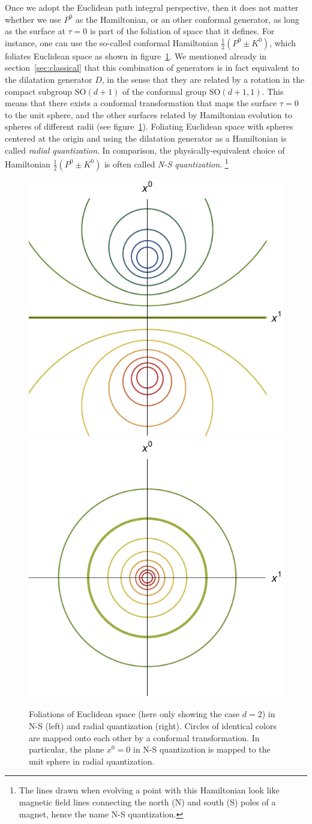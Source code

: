 \documentclass[a4paper,12pt]{article}
\newcommand{\SO}{\text{SO}}
\numberwithin{equation}{section}
\begin{document}
Once we adopt the Euclidean path integral perspective, then it does not matter whether we use $P^0$ as the Hamiltonian, or an other conformal generator, as long as the surface at $\tau = 0$ is part of the foliation of space that it defines. For instance, one can use the so-called conformal Hamiltonian $\frac{1}{2} (P^0 \pm K^0)$, which foliates Euclidean space as shown in figure~\ref{fig:foliations}.
We mentioned already in section~\ref{sec:classical} that this combination of generators is in fact equivalent to the dilatation generator $D$, in the sense that they are related by a rotation in the compact subgroup $\SO(d + 1)$ of the conformal group $\SO(d+1, 1)$.
This means that there exists a conformal transformation that maps the surface $\tau = 0$ to the unit sphere, and the other surfaces related by Hamiltonian evolution to spheres of different radii (see figure~\ref{fig:foliations}).
Foliating Euclidean space with spheres centered at the origin and using the dilatation generator as a Hamiltonian is called \emph{radial quantization}. In comparison, the physically-equivalent choice of Hamiltonian  $\frac{1}{2} (P^0 \pm K^0)$ is often called \emph{N-S quantization}.%
%
\footnote{The lines drawn when evolving a point with this Hamiltonian look like magnetic field lines connecting the north (N) and south (S) poles of a magnet, hence the name N-S quantization.}
%
\begin{figure}
	\includegraphics[width=0.48\linewidth]{figures/NSfoliation.pdf}
	\hfill
	\includegraphics[width=0.48\linewidth]{figures/Rfoliation.pdf}
	\caption{Foliations of Euclidean space
	(here only showing the case $d = 2$) 
	in N-S (left) and radial quantization (right).
	Circles of identical colors are mapped onto each other
	by a conformal transformation. In particular, the plane 
	$x^0 = 0$ in N-S quantization is mapped to the unit sphere 
	in radial quantization.}
	\label{fig:foliations}
\end{figure}
\end{document}
